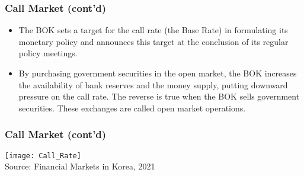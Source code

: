 \documentclass[10pt]{beamer}
\begin{document}
\begin{frame}
\begin{itemize}
			
			
		\end{itemize}
		
	\end{frame}
	
	
	
	
	\begin{frame}
		\frametitle{Call Market (cont'd)} 
		
		\begin{itemize}  \vspace{5pt} \itemsep10pt
			\item The BOK sets a target for the call rate (the Base Rate) in formulating its monetary policy and announces this target at the conclusion of its regular policy meetings.
			
			\item By purchasing government securities in the open market, the BOK increases the availability of bank reserves and the money supply, putting downward pressure on the call rate. The reverse is true when the BOK sells government securities. These exchanges are called open market operations.
			
		\end{itemize}
		
	\end{frame}
	
	
	
	\begin{frame}
		\frametitle{Call Market (cont'd)} %
		\begin{center}
			\texttt{[image: Call\_Rate]} \\
			{\scriptsize Source: Financial Markets in Korea, 2021}		
		\end{center}
		
	\end{frame}
	
	
	
	
	
	
	
\end{document}
